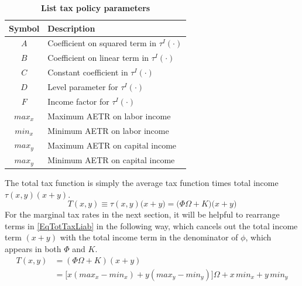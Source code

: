 \documentclass[letterpaper,12pt]{article}
\theoremstyle{definition}
\begin{document}
\begin{spacing}{1.5}
    \begin{table}[htbp] \centering \captionsetup{width=4.7in}
    \caption{\label{TaxParams}\textbf{List tax policy parameters}}
      \begin{threeparttable}
      \begin{tabular}{>{\footnotesize}c |>{\footnotesize}l }
        \hline\hline
        Symbol & \quad\quad\quad\quad Description  \\
        \hline
        $A$ & Coefficient on squared term in $\tau^I(\cdot)$  \\
        $B$ & Coefficient on linear term in $\tau^I(\cdot)$  \\
        $C$ & Constant coefficient in $\tau^I(\cdot)$  \\
        $D$ & Level parameter for $\tau^I(\cdot)$  \\
        $F$ & Income factor for $\tau^I(\cdot)$\\
        $max_x$ & Maximum AETR on labor income  \\
        $min_x$ & Minimum AETR on labor income \\
        $max_y$ & Maximum AETR on capital income  \\
        $max_y$ & Minimum AETR on capital income \\
        \hline\hline
      \end{tabular}
      \end{threeparttable}
    \end{table}



    The total tax function is simply the average tax function times total income $\tau(x,y)(x+y)$.
    \begin{equation}\label{EqTotTaxLiab}
      T(x,y) \equiv \tau(x,y)\bigl(x + y\bigr) = \bigl(\Phi\Omega + K\bigr)\bigl(x + y\bigr)
    \end{equation}
    For the marginal tax rates in the next section, it will be helpful to rearrange terms in \eqref{EqTotTaxLiab} in the following way, which cancels out the total income term $(x+y)$ with the total income term in the denominator of $\phi$, which appears in both $\Phi$ and $K$.
    \begin{equation}\label{EqTotTaxLiab2}
      \begin{split}
        T(x,y) &= (\Phi\Omega + K)(x+y) \\
        &= \bigl[x(max_x - min_x) + y(max_y - min_y)\bigr]\Omega + x\,min_x + y\,min_y
      \end{split}
    \end{equation}


\end{spacing}
\end{document}
